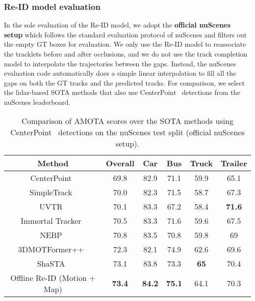 \documentclass{article} \usepackage{iclr2023_conference,times}
\begin{document}
\subsubsection{Re-ID model evaluation}
\label{sec: Re-ID evaluation online}
\vspace{-1mm}
In the sole evaluation of the Re-ID model, we adopt the \textbf{official nuScenes setup} which follows the standard evaluation protocol of nuScenes and filters out the empty GT boxes for evaluation. We only use the Re-ID model to reassociate the tracklets before and after occlusions, and we do not use the track completion model to interpolate the trajectories between the gaps. Instead, the nuScenes evaluation code automatically does a simple linear interpolation to fill all the gaps on both the GT tracks and the predicted tracks. For comparison, we select the lidar-based SOTA methods that also use CenterPoint~\cite{Centerpoint} detections from the nuScenes leaderboard. 

\begin{table*}[t]\vspace{-6mm}
    \centering
    \begin{tabular}{c|c|cccc}
    \textbf{Method}              & \textbf{Overall} & \textbf{Car}  & \textbf{Bus}  & \textbf{Truck} & \textbf{Trailer} \\ \hline
    CenterPoint~\cite{Centerpoint}                  & 69.8            & 82.9          & 71.1          & 59.9           & 65.1             \\
    SimpleTrack~\cite{SimpleTrack}                   & 70.0             & 82.3          & 71.5          & 58.7           & 67.3            \\
    UVTR~\cite{UVTR}                   & 70.1             & 83.3          & 67.2          & 58.4           & \textbf{71.6}             \\
    Immortal Tracker~\cite{Immortaltrackers}                   & 70.5             & 83.3          & 71.6          & 59.6           & 67.5             \\
    NEBP~\cite{NEBP}                         & 70.8           & 83.5          & 70.8          & 59.8           & 69               \\
    3DMOTFormer++~\cite{3DMOTFormer}             & 72.3             & 82.1          & 74.9          & 62.6           & 69.6             \\
    ShaSTA~\cite{ShaSTA}                       & 73.1           & 83.8          & 73.3          & \textbf{65}    & 70.4
    \\ \hline
    Offline Re-ID (Motion + Map) & \textbf{73.4}  & \textbf{84.2} & \textbf{75.1} & 64.1           & 70.3            
    \end{tabular}
    \caption{Comparison of AMOTA scores over the SOTA methods using CenterPoint~\cite{Centerpoint} detections on the nuScenes test split (official nuScenes setup). }
    \label{tab: Re-ID AMOTA test }
\end{table*}
\end{document}

